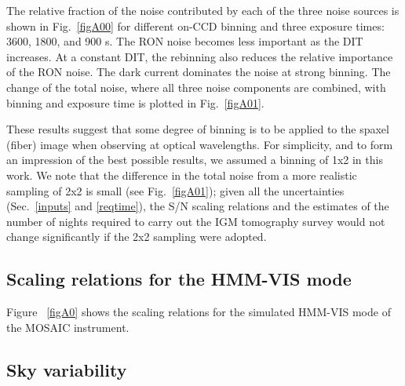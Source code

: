 \documentclass{aa}
\begin{document}
{{{{{{{{{{{{{{The relative fraction of the noise contributed by each of the three noise sources is shown in Fig.~\ref{figA00} for different on-CCD binning and three exposure times: 3600, 1800, and 900 s. The RON noise becomes less important as the DIT increases. At a constant DIT, the rebinning also reduces the relative importance of the RON noise. The dark current dominates the noise at strong binning. The change of the total noise, where all three noise components are combined, with binning and exposure time is plotted in Fig.~\ref{figA01}.

These results suggest that some degree of binning is to be applied to the spaxel (fiber) image when observing at optical wavelengths. For simplicity, and to form an impression of the best possible results, we assumed a binning of 1x2 in this work. We note that the difference in the total noise from a more realistic sampling of 2x2 is small (see Fig.~\ref{figA01}); given all the uncertainties (Sec.~\ref{inputs} and \ref{reqtime}), the S/N scaling relations and the estimates of the number of nights required to carry out the IGM tomography survey would not change significantly if the 2x2 sampling were adopted. 


\subsection{Scaling relations for the HMM-VIS mode}

Figure ~\ref{figA0} shows the scaling relations for the simulated HMM-VIS mode of the MOSAIC instrument.

\subsection{Sky variability}
\label{skyvar}

}}}}}}}}}}}}}}
\end{document}

